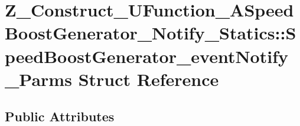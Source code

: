 \hypertarget{struct_z___construct___u_function___a_speed_boost_generator___notify___statics_1_1_speed_boost_generator__event_notify___parms}{}\section{Z\+\_\+\+Construct\+\_\+\+U\+Function\+\_\+\+A\+Speed\+Boost\+Generator\+\_\+\+Notify\+\_\+\+Statics\+::Speed\+Boost\+Generator\+\_\+event\+Notify\+\_\+\+Parms Struct Reference}
\label{struct_z___construct___u_function___a_speed_boost_generator___notify___statics_1_1_speed_boost_generator__event_notify___parms}
\subsection*{Public Attributes}
